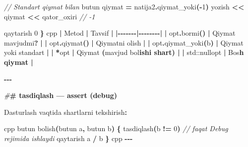 \documentclass[a4paper,11pt,twoside,openright]{book}
\newenvironment{Shaded}{\begin{snugshade}}{\end{snugshade}}
\newcommand{\BuiltInTok}[1]{#1}
\newcommand{\CharTok}[1]{\textcolor[rgb]{0.31,0.60,0.02}{#1}}
\newcommand{\CommentTok}[1]{\textcolor[rgb]{0.56,0.35,0.01}{\textit{#1}}}
\newcommand{\DecValTok}[1]{\textcolor[rgb]{0.00,0.00,0.81}{#1}}
\newcommand{\ErrorTok}[1]{\textcolor[rgb]{0.64,0.00,0.00}{\textbf{#1}}}
\newcommand{\NormalTok}[1]{#1}
\newcommand{\OperatorTok}[1]{\textcolor[rgb]{0.81,0.36,0.00}{\textbf{#1}}}
\newcommand{\PreprocessorTok}[1]{\textcolor[rgb]{0.56,0.35,0.01}{\textit{#1}}}
\begin{document}
\begin{Shaded}
\begin{Highlighting}[]
    \CommentTok{// Standart qiymat bilan}
\NormalTok{    butun qiymat }\OperatorTok{=}\NormalTok{ natija2}\OperatorTok{.}\NormalTok{qiymat\_yoki}\OperatorTok{({-}}\DecValTok{1}\OperatorTok{)}
\NormalTok{    yozish }\OperatorTok{\textless{}\textless{}}\NormalTok{ qiymat }\OperatorTok{\textless{}\textless{}}\NormalTok{ qator\_oxiri   }\CommentTok{// {-}1}

\NormalTok{    qaytarish }\DecValTok{0}
\OperatorTok{\}}
\ErrorTok{\textasciigrave{}\textasciigrave{}\textasciigrave{}}\NormalTok{cpp}
\OperatorTok{|}\NormalTok{ Metod }\OperatorTok{|}\NormalTok{ Tavsif }\OperatorTok{|}
\OperatorTok{|{-}{-}{-}{-}{-}{-}{-}|{-}{-}{-}{-}{-}{-}{-}{-}|}
\OperatorTok{|} \ErrorTok{\textasciigrave{}}\NormalTok{opt}\OperatorTok{.}\NormalTok{bormi}\OperatorTok{()}\ErrorTok{\textasciigrave{}} \OperatorTok{|}\NormalTok{ Qiymat mavjudmi}\OperatorTok{?} \OperatorTok{|}
\OperatorTok{|} \ErrorTok{\textasciigrave{}}\NormalTok{opt}\OperatorTok{.}\NormalTok{qiymat}\OperatorTok{()}\ErrorTok{\textasciigrave{}} \OperatorTok{|}\NormalTok{ Qiymatni olish }\OperatorTok{|}
\OperatorTok{|} \ErrorTok{\textasciigrave{}}\NormalTok{opt}\OperatorTok{.}\NormalTok{qiymat\_yoki}\OperatorTok{(}\NormalTok{b}\OperatorTok{)}\ErrorTok{\textasciigrave{}} \OperatorTok{|}\NormalTok{ Qiymat yoki standart }\OperatorTok{|}
\OperatorTok{|} \ErrorTok{\textasciigrave{}}\OperatorTok{*}\NormalTok{opt}\ErrorTok{\textasciigrave{}} \OperatorTok{|}\NormalTok{ Qiymat }\OperatorTok{(}\NormalTok{mavjud bo}\CharTok{\textquotesingle{}l}\ErrorTok{ishi shart) |}
\OperatorTok{|} \ErrorTok{\textasciigrave{}}\BuiltInTok{std::}\NormalTok{nullopt}\ErrorTok{\textasciigrave{}} \OperatorTok{|}\NormalTok{ Bo}\CharTok{\textquotesingle{}s}\ErrorTok{h qiymat |}

\OperatorTok{{-}{-}{-}}

\PreprocessorTok{\#}\ErrorTok{\# \textasciigrave{}tasdiqlash\textasciigrave{} — assert (debug)}

\NormalTok{Dasturlash vaqtida shartlarni tekshirish}\OperatorTok{:}

\ErrorTok{\textasciigrave{}\textasciigrave{}\textasciigrave{}}\NormalTok{cpp}
\NormalTok{butun bolish}\OperatorTok{(}\NormalTok{butun a}\OperatorTok{,}\NormalTok{ butun b}\OperatorTok{)} \OperatorTok{\{}
\NormalTok{    tasdiqlash}\OperatorTok{(}\NormalTok{b }\OperatorTok{!=} \DecValTok{0}\OperatorTok{)}    \CommentTok{// faqat Debug rejimida ishlaydi}
\NormalTok{    qaytarish a }\OperatorTok{/}\NormalTok{ b}
\OperatorTok{\}}
\ErrorTok{\textasciigrave{}\textasciigrave{}\textasciigrave{}}\NormalTok{cpp}
\OperatorTok{{-}{-}{-}}


\end{Highlighting}
\end{Shaded}
\end{document}
